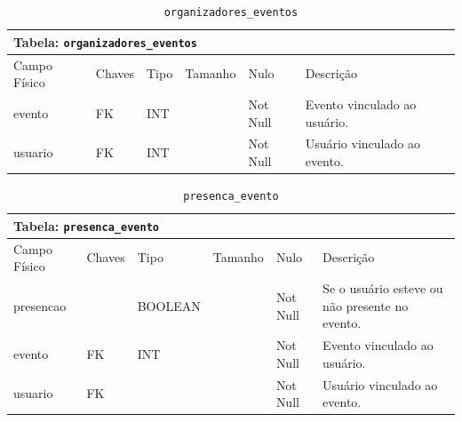 \documentclass[12pt,a4paper]{article}
\begin{document}
\begin{center}
\begin{table}[h!]
	\caption{\texttt{organizadores\_eventos}}
	\label{tabela:organizadoresEventos}
	\begin{tabular}{|p{2.5cm}|p{1cm}|p{1.25cm}|p{1.75cm}|p{1.25cm}|p{5cm}|}\hline	
		\multicolumn{6}{|p{16cm}|}{\cellcolor{cinzaClaro}  \centering Tabela: \texttt{organizadores\_eventos}} \\ \hline %
		{\small Campo Físico}   & {\small Chaves} & {\small Tipo} & {\small Tamanho} & {\small Nulo} & {\small Descrição}\\\hline %
		
		{\tiny evento} & {\tiny FK} & {\tiny INT} & {\tiny } & {\tiny Not Null} &{\tiny Evento vinculado ao usuário.}\\\hline
		{\tiny usuario} & {\tiny FK} & {\tiny INT} & {\tiny } & {\tiny Not Null} &{\tiny Usuário vinculado ao evento.}\\\hline
			
	\end{tabular}
\end{table}	
\end{center}


\begin{center}
\begin{table}[h!]
	\caption{\texttt{presenca\_evento}}
	\label{tabela:presencaEvento}
	\begin{tabular}{|p{2.5cm}|p{1cm}|p{1.25cm}|p{1.75cm}|p{1.25cm}|p{6cm}|}\hline	
		\multicolumn{6}{|p{16cm}|}{\cellcolor{cinzaClaro}  \centering Tabela: \texttt{presenca\_evento}} \\ \hline %
		{\small Campo Físico}   & {\small Chaves} & {\small Tipo} & {\small Tamanho} & {\small Nulo} & {\small Descrição}\\\hline %
		
		{\tiny presencao}  & {\tiny } & {\tiny BOOLEAN } & {\tiny } & {\tiny Not Null} &{\tiny Se o usuário esteve ou não presente no evento.}\\\hline
		{\tiny evento}  & {\tiny FK} & {\tiny INT} & {\tiny } & {\tiny Not Null } &{\tiny Evento vinculado ao usuário.}\\\hline
		{\tiny usuario}  & {\tiny FK} & {\tiny } & {\tiny } & {\tiny Not Null} &{\tiny Usuário vinculado ao evento.}\\\hline
			
	\end{tabular}
\end{table}	
\end{center}
\end{document}
